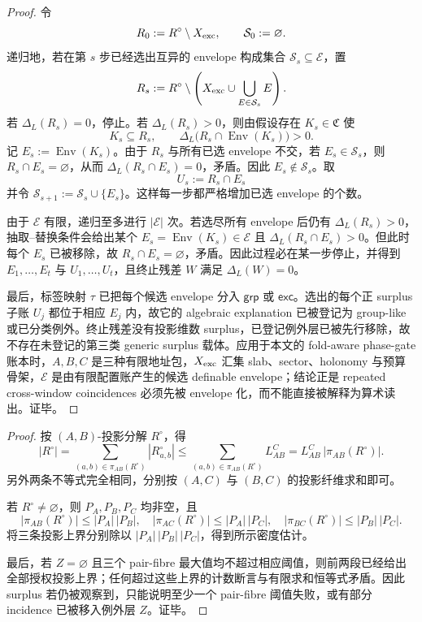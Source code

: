 \begin{proof}
令
\[
R_0:=R^\circ\setminus X_{\rm exc},\qquad \mathcal S_0:=\varnothing.
\]
递归地，若在第 \(s\) 步已经选出互异的 envelope 构成集合
\(\mathcal S_s\subseteq\mathcal E\)，置
\[
R_s:=R^\circ\setminus \left(X_{\rm exc}\cup\bigcup_{E\in\mathcal S_s}E\right).
\]
若 \(\Delta_L(R_s)=0\)，停止。若 \(\Delta_L(R_s)>0\)，则由假设存在
\(K_s\in\mathfrak C\) 使
\[
K_s\subseteq R_s,\qquad
\Delta_L\bigl(R_s\cap \operatorname{Env}(K_s)\bigr)>0.
\]
记 \(E_s:=\operatorname{Env}(K_s)\)。由于 \(R_s\) 与所有已选 envelope 不交，若
\(E_s\in\mathcal S_s\)，则 \(R_s\cap E_s=\varnothing\)，从而
\(\Delta_L(R_s\cap E_s)=0\)，矛盾。因此 \(E_s\notin\mathcal S_s\)。取
\[
U_s:=R_s\cap E_s
\]
并令 \(\mathcal S_{s+1}:=\mathcal S_s\cup\{E_s\}\)。这样每一步都严格增加已选 envelope 的个数。

由于 \(\mathcal E\) 有限，递归至多进行 \(|\mathcal E|\) 次。若选尽所有 envelope 后仍有
\(\Delta_L(R_s)>0\)，抽取--替换条件会给出某个
\(E_s=\operatorname{Env}(K_s)\in\mathcal E\) 且
\(\Delta_L(R_s\cap E_s)>0\)。但此时每个 \(E_s\) 已被移除，故
\(R_s\cap E_s=\varnothing\)，矛盾。因此过程必在某一步停止，并得到
\(E_1,\ldots,E_t\) 与 \(U_1,
\ldots,U_t\)，且终止残差 \(W\) 满足
\(\Delta_L(W)=0\)。

最后，标签映射 \(\tau\) 已把每个候选 envelope 分入
\(\mathsf{grp}\) 或 \(\mathsf{exc}\)。选出的每个正 surplus 子账
\(U_j\) 都位于相应 \(E_j\) 内，故它的 algebraic explanation 已被登记为 group-like 或已分类例外。终止残差没有投影维数 surplus，已登记例外层已被先行移除，故不存在未登记的第三类 generic surplus 载体。应用于本文的 fold-aware phase-gate 账本时，\(A,B,C\) 是三种有限地址包，\(X_{\rm exc}\) 汇集 slab、sector、holonomy 与预算骨架，\(\mathcal E\) 是由有限配置账产生的候选 definable envelope；结论正是 repeated cross-window coincidences 必须先被 envelope 化，而不能直接被解释为算术读出。证毕。
\end{proof}

\begin{proof}
按 \((A,B)\)-投影分解 \(R^\circ\)，得
\[
|R^\circ|
=\sum_{(a,b)\in\pi_{AB}(R^\circ)} |R^\circ_{a,b}|
\le \sum_{(a,b)\in\pi_{AB}(R^\circ)} L_{AB}^{C}
=L_{AB}^{C}\,|\pi_{AB}(R^\circ)|.
\]
另外两条不等式完全相同，分别按 \((A,C)\) 与 \((B,C)\) 的投影纤维求和即可。

若 \(R^\circ\ne\varnothing\)，则 \(P_A,P_B,P_C\) 均非空，且
\[
|\pi_{AB}(R^\circ)|\le |P_A|\,|P_B|,\quad
|\pi_{AC}(R^\circ)|\le |P_A|\,|P_C|,\quad
|\pi_{BC}(R^\circ)|\le |P_B|\,|P_C|.
\]
将三条投影上界分别除以 \(|P_A|\,|P_B|\,|P_C|\)，得到所示密度估计。

最后，若 \(Z=\varnothing\) 且三个 pair-fibre 最大值均不超过相应阈值，则前两段已经给出全部授权投影上界；任何超过这些上界的计数断言与有限求和恒等式矛盾。因此 surplus 若仍被观察到，只能说明至少一个 pair-fibre 阈值失败，或有部分 incidence 已被移入例外层 \(Z\)。证毕。
\end{proof}

